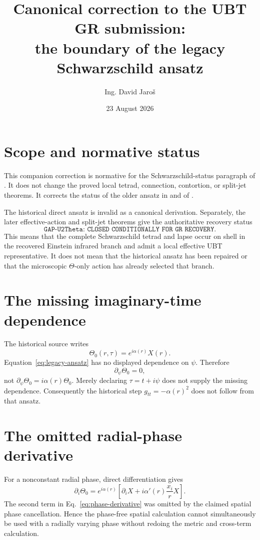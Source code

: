 \documentclass[11pt,a4paper]{article}
\title{Canonical correction to the UBT GR submission:\\
the boundary of the legacy Schwarzschild ansatz}
\author{Ing. David Jaro\v{s}}
\date{23 August 2026}
\begin{document}
\maketitle
\UBTProvenanceNotice

\section{Scope and normative status}
This companion correction is normative for the Schwarzschild-status paragraph
of .  It does not change the proved local
tetrad, connection, contortion, or split-jet theorems.  It corrects the status
of the older ansatz in
 and of
.

The historical direct ansatz is invalid as a canonical derivation.  Separately,
the later effective-action and split-jet theorems give the authoritative
recovery status
\[
 \boxed{\texttt{GAP-U2Theta: CLOSED CONDITIONALLY FOR GR RECOVERY}.}
\]
This means that the complete Schwarzschild tetrad and lapse occur on shell in
the recovered Einstein infrared branch and admit a local effective UBT
representative.  It does not mean that the historical ansatz has been repaired
or that the microscopic $\Theta$-only action has already selected that branch.

\section{The missing imaginary-time dependence}
The historical source writes
\begin{equation}
 \Theta_0(r,\tau)=e^{i\alpha(r)}X(r).
 \label{eq:legacy-ansatz}
\end{equation}
Equation~\eqref{eq:legacy-ansatz} has no displayed dependence on $\psi$.
Therefore
\begin{equation}
 \partial_\psi\Theta_0=0,
 \label{eq:psi-zero}
\end{equation}
not $\partial_\psi\Theta_0=i\alpha(r)\Theta_0$.  Merely declaring
$\tau=t+i\psi$ does not supply the missing dependence.  Consequently the
historical step $g_{tt}=-\alpha(r)^2$ does not follow from that ansatz.

\section{The omitted radial-phase derivative}
For a nonconstant radial phase, direct differentiation gives
\begin{equation}
 \partial_i\Theta_0=e^{i\alpha(r)}\left[
 \partial_iX+i\alpha'(r)\frac{x_i}{r}X\right].
 \label{eq:phase-derivative}
\end{equation}
The second term in Eq.~\eqref{eq:phase-derivative} was omitted by the claimed
spatial phase cancellation.  Hence the phase-free spatial calculation cannot
simultaneously be used with a radially varying phase without redoing the
metric and cross-term calculation.
\end{document}
